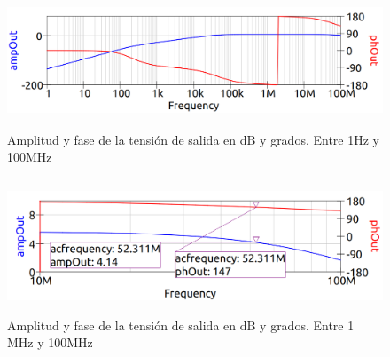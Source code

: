 \begin{figure}
    \centering
    \includegraphics[height=4cm]{Images/16.png}
    \caption{Amplitud y fase de la tensión de salida en dB y grados. Entre 1Hz y 100MHz}
    \label{fig:0z0z1:3}
\end{figure}

\begin{figure}
    \centering
    \includegraphics[height=4cm]{Images/17.png}
    \caption{Amplitud y fase de la tensión de salida en dB y grados. Entre 1 MHz y 100MHz}
    \label{fig:0z0z1:4}
\end{figure}


